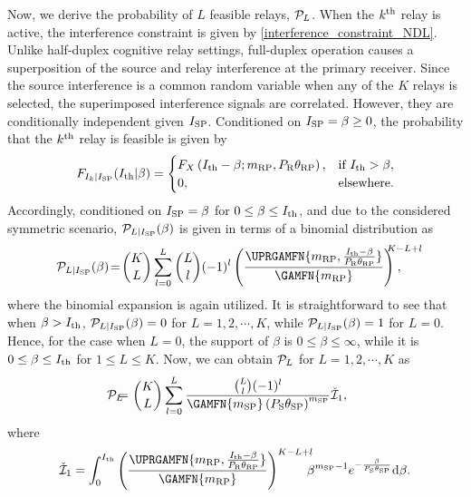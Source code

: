 \documentclass[10pt,journal]{IEEEtran}
\begin{document}
Now, we derive the probability of $L$ feasible relays, $\mathcal{P}_L$. When the $k^{\rm th}$ relay is active, the interference constraint is given by \eqref{interference_constraint_NDL}. Unlike half-duplex cognitive relay settings, full-duplex operation causes a superposition of the source and relay interference at the primary receiver. Since the source interference is a common random variable when any of the $K$ relays is selected, the superimposed interference signals are correlated. However, they are conditionally independent given $I_{{\rm S} {\rm P}}$. Conditioned on $I_{{\rm S} {\rm P}}=\beta\geq 0$, the probability that the $k^{\rm th}$ relay is feasible is given by
\begin{equation}
F_{I_{k} \vert I_{{\rm S} {\rm P}}}(I_{\rm th} \vert \beta)
=\begin{cases}
F_X\left(I_{\rm th}-\beta;{m_{{\rm R} {\rm P}}},P_{{\rm R}}{\theta_{{\rm R} {\rm P}}}\right)
, &\mbox{if }  I_{\rm th}>\beta,\\ 0, & \mbox{elsewhere.}\end{cases}\label{conditional_distribution_of_interference_paths}
\end{equation}
Accordingly, conditioned on $I_{{\rm S} {\rm P}}=\beta$ for $0 \leq \beta \leq I_{\rm th}$, and due to the considered symmetric scenario, $\mathcal{P}_{L \vert I_{{\rm S} {\rm P}}}(\beta)$ is given in terms of a binomial distribution as
\begin{equation}
\!\!\!\!\!\!\mathcal{P}_{L \vert \Isp}(\beta)
\!=\! {K \choose L} \sum_{l=0}^L {L \choose l}(-1)^l \left(\frac{\UPRGAMFN{\mrp,\frac{\Ith-\beta}{\PR\thetarp}}}{\GAMFN{\mrp}}\right)^{\!\!\!\!K-L+l}\!\!\!\!\!\!\!\!\!\!\!\!\!,\label{conditional_PL_Nakagami}
\end{equation}
where the binomial expansion is again utilized. It is straightforward to see that when $\beta>I_{\rm th}$, $\mathcal{P}_{L \vert I_{{\rm S} {\rm P}}}(\beta)=0$ for $L=1,2,\cdots,K$, while $\mathcal{P}_{L \vert I_{{\rm S} {\rm P}}}(\beta)=1$ for $L=0$. Hence, for the case when $L=0$, the support of $\beta$ is $0\leq\beta\leq\infty$, while it is $0\leq\beta\leq I_{\rm th}$ for $1 \leq L \leq K$. Now, we can obtain $\mathcal{P}_L$ for $L=1,2,\cdots,K$ as
\begin{eqnarray}
\!\!\!\!\!\!\!\!\PL\!\!\!\!
&=&
\!\!\!\! {K \choose L} \sum_{l=0}^L  \frac{{L \choose l}(-1)^l}{\GAMFN{\msp}\left(\PS\thetasp\right)^\msp} \mathcal{\check{I}}_1,
\end{eqnarray}
where
\begin{eqnarray}
\mathcal{\check{I}}_1
=
\int_0^{\Ith} \left(\frac{\UPRGAMFN{\mrp,\frac{\Ith-\beta}{\PR\thetarp}}}{\GAMFN{\mrp}}\right)^{K-L+l} \!\!\!\!\beta^{\msp-1}e^{-\frac{\beta}{\PS\thetasp}} \mathrm{d}\beta.\nonumber
\end{eqnarray}
\end{document}
